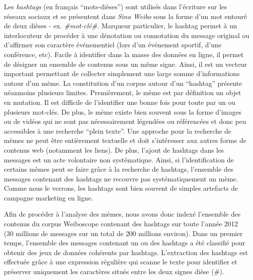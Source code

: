 Les \textit{hashtags }(en fran\c{c}ais {\textquotedblleft}mots-dièses{\textquotedblright}) sont utilisés dans l{\textquoteright}écriture sur les réseaux sociaux et se présentent dans \textit{Sina Weibo} sous la forme d{\textquoteright}un mot entouré de deux dièses - ex. \textit{\#mot-clé\#}. Marqueur particulier, le hashtag permet à un interlocuteur de procéder à une dénotation ou connotation du message original \citep{Romero2011} ou d{\textquoteright}affirmer son caractère événementiel (lors d{\textquoteright}un événement sportif, d{\textquoteright}une conférence, etc). Facile à identifier dans la masse des données en ligne, il permet de désigner un ensemble de contenus sous un m\^eme signe. Ainsi, il est un vecteur important permettant de collecter simplement une large somme d{\textquoteright}informations autour d{\textquoteright}un mème. La constitution d{\textquoteright}un corpus autour d{\textquoteright}un {\textquotedblleft}hashtag{\textquotedblright} présente néanmoins plusieurs limites. Premièrement, le mème est par définition un objet en mutation. Il est difficile de l{\textquoteright}identifier une bonne fois pour toute par un ou plusieurs mot-clés. De plus, le mème existe bien souvent sous la forme d{\textquoteright}images ou de vidéos qui ne sont pas nécessairement légendées ou référencées et donc peu accessibles à une recherche {\textquotedblleft}plein texte{\textquotedblright}. Une approche pour la recherche de mèmes ne peut \^etre entièrement textuelle et doit s{\textquoteright}intéresser aux autres forme de contenus web (notamment les liens). De plus, l{\textquoteright}ajout de hashtags dans les messages est un acte volontaire non systématique. Ainsi, si l{\textquoteright}identification de certains mèmes peut se faire gr\^ace à la recherche de hashtags, l{\textquoteright}ensemble des messages contenant des hashtags ne recouvre pas systématiquement un mème. Comme nous le verrons, les hashtags sont bien souvent de simples artefacts de campagne marketing en ligne.

Afin de procéder à l{\textquoteright}analyse des mèmes, nous avons donc indexé l{\textquoteright}ensemble des contenus du corpus Weiboscope contenant des hashtags sur toute l{\textquoteright}année 2012 (30 millions de messages sur un total de 200 millions environ). Dans un premier temps, l{\textquoteright}ensemble des messages contenant un ou des hashtags a été classifié pour obtenir des jeux de données cohérents par hashtags. L{\textquoteright}extraction des hashtags est effectuée gr\^ace à une expression régulière qui scanne le texte pour identifier et préserver uniquement les caractères situés entre les deux signes dièse (\#).


